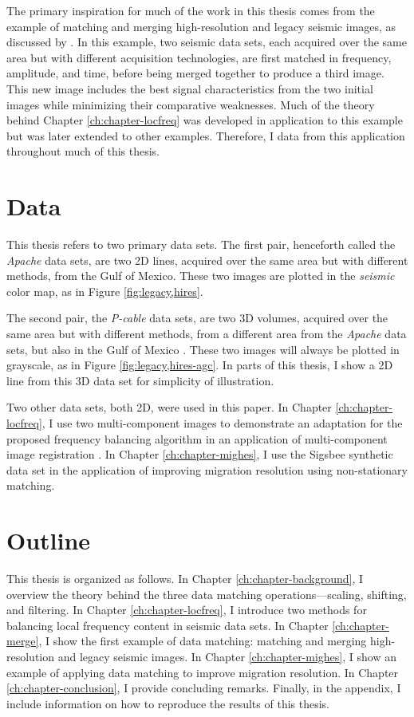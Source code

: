 The primary inspiration for much of the work in this thesis comes from the example of matching and merging high-resolution and legacy seismic images, as discussed by \cite{merge2, merge}.
In this example, two seismic data sets, each acquired over the same area but with different acquisition technologies, are first matched in frequency, amplitude, and time, before being merged together to produce a third image.
This new image includes the best signal characteristics from the two initial images while minimizing their comparative weaknesses.
Much of the theory behind Chapter \ref{ch:chapter-locfreq} was developed in application to this example but was later extended to other examples.
Therefore, I data from this application throughout much of this thesis.

\section{Data}
This thesis refers to two primary data sets. 
The first pair, henceforth called the {\it Apache} data sets, are two 2D lines, acquired over the same area but with different methods, from the Gulf of Mexico. 
These two images are plotted in the {\em seismic} color map, as in Figure \ref{fig:legacy,hires}.

The second pair, the {\em P-cable} data sets, are two 3D volumes, acquired over the same area but with different methods, from a different area from the {\em Apache} data sets, but also in the Gulf of Mexico \cite[]{pcable,data}.
These two images will always be plotted in grayscale, as in Figure \ref{fig:legacy,hires-agc}.
In parts of this thesis, I show a 2D line from this 3D data set for simplicity of illustration.

Two other data sets, both 2D, were used in this paper. 
In Chapter \ref{ch:chapter-locfreq}, I use two multi-component images to demonstrate an adaptation for the proposed frequency balancing algorithm in an application of multi-component image registration \cite[]{attr}.
In Chapter \ref{ch:chapter-mighes}, I use the Sigsbee synthetic data set \cite[]{sigsbee} in the application of improving migration resolution using non-stationary matching.

\section{Outline}
This thesis is organized as follows.
In Chapter \ref{ch:chapter-background}, I overview the theory behind the three data matching operations---scaling, shifting, and filtering.
In Chapter \ref{ch:chapter-locfreq}, I introduce two methods for balancing local frequency content in seismic data sets.
In Chapter \ref{ch:chapter-merge}, I show the first example of data matching: matching and merging high-resolution and legacy seismic images.
In Chapter \ref{ch:chapter-mighes}, I show an example of applying data matching to improve migration resolution.
In Chapter \ref{ch:chapter-conclusion}, I provide concluding remarks.
Finally, in the appendix, I include information on how to reproduce the results of this thesis.

